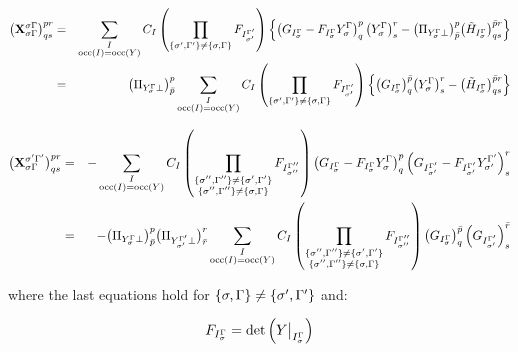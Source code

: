 \documentclass[a4paper,11pt]{article}
\begin{document}
\begin{eqnarray}
  \big( \mathbf{X}_{\sigma \Gamma}^{\sigma \Gamma} \big)^{pr}_{qs} &=&
  \sum_{\substack{I\\\text{occ}(I) = \text{occ}(Y)}} C_I
  \left( \prod_{\{\sigma', {\Gamma'}\} \ne \{\sigma, \Gamma\}} F_{I_{\sigma'}^{\Gamma'}} \right)
  \left\{ \left( G_{I_\sigma^{\Gamma}} - F_{I_\sigma^{\Gamma}} Y_\sigma^{\Gamma}  \right)^p_q \big( Y_\sigma^{\Gamma} \big)^r_s
  - \big( \Pi_{Y_\sigma^{\Gamma} \perp} \big)^p_{\bar{p}} \big( \tilde{H}_{I_\sigma^{\Gamma}} \big)^{\bar{p}r}_{qs} \right\}\\
  &=&
  \big( \Pi_{Y_\sigma^{\Gamma} \perp} \big)^p_{\bar{p}}
  \sum_{\substack{I\\\text{occ}(I) = \text{occ}(Y)}} C_I
  \left( \prod_{\{\sigma', {\Gamma'}\} \ne \{\sigma, \Gamma\}} F_{I_{\sigma'}^{\Gamma'}} \right)
  \left\{ \big( G_{I_\sigma^{\Gamma}} \big)^{\bar{p}}_q \big( Y_\sigma^{\Gamma} \big)^r_s
  - \big( \tilde{H}_{I_\sigma^{\Gamma}} \big)^{{\bar{p}}r}_{qs} \right\}
\end{eqnarray}

\begin{eqnarray}
  \big( \mathbf{X}_{\sigma \irp}^{\sigma' \irpP} \big)^{pr}_{qs} &=&
  -%
  \sum_{\substack{I\\\text{occ}(I) = \text{occ}(Y)}} C_I
  \left(
    \prod_{\substack{
        \{\sigma'', \irpPP\} \ne \{\sigma', \irpP\} \\
        \{\sigma'', \irpPP\} \ne \{\sigma , \irp \}}}
    F_{I_{\sigma''}^{\irpPP}} \right)
  \left( G_{I_\sigma^\irp} - F_{I_\sigma^\irp} Y_\sigma^\irp  \right)^p_q
  \left( G_{I_{\sigma'}^\irpP} - F_{I_{\sigma'}^\irpP} Y_{\sigma'}^\irpP \right)^r_s\\
  &=&
  -%
  \big( \Pi_{Y_\sigma^\irp \perp} \big)^p_{\bar{p}}
  \big( \Pi_{Y_{\sigma'}^\irpP \perp} \big)^r_{\bar{r}}
  \sum_{\substack{I\\\text{occ}(I) = \text{occ}(Y)}} C_I
  \left(
    \prod_{\substack{
        \{\sigma'', \irpPP\} \ne \{\sigma', \irpP\} \\
        \{\sigma'', \irpPP\} \ne \{\sigma , \irp \}}}
    F_{I_{\sigma''}^{\irpPP}} \right)
  \left( G_{I_\sigma^\irp}  \right)^{\bar{p}}_q
  \left( G_{I_{\sigma'}^\irpP} \right)^{\bar{r}}_s
\end{eqnarray}

where the last equations hold for ${\{\sigma,\Gamma\} \ne \{\sigma',{\Gamma'}\}}$ and:

\begin{equation}
  F_{I_\sigma^{\Gamma}} = \text{det} \left( Y\big|_{I_\sigma^{\Gamma}} \right)
\end{equation}
\end{document}
